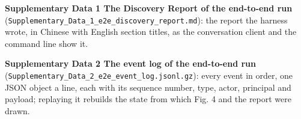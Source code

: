 \documentclass[
]{article}
\begin{document}
\textbf{Supplementary Data 1 \textbar{} The Discovery Report of the
end-to-end run}
(\texttt{Supplementary\_Data\_1\_e2e\_discovery\_report.md}): the report
the harness wrote, in Chinese with English section titles, as the
conversation client and the command line show it.

\textbf{Supplementary Data 2 \textbar{} The event log of the end-to-end
run} (\texttt{Supplementary\_Data\_2\_e2e\_event\_log.jsonl.gz}): every
event in order, one JSON object a line, each with its sequence number,
type, actor, principal and payload; replaying it rebuilds the state from
which Fig. 4 and the report were drawn.
\end{document}
